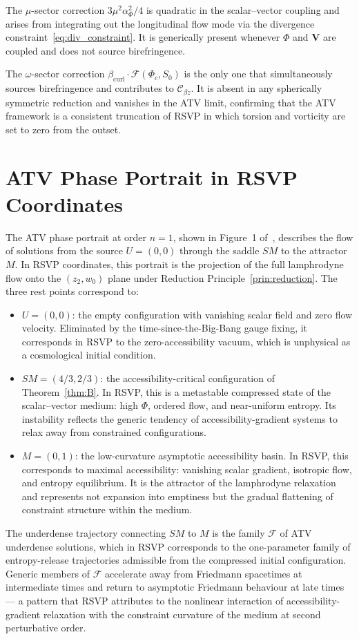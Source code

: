 \documentclass[12pt,a4paper]{article}
\theoremstyle{plain}
\theoremstyle{definition}
\theoremstyle{remark}
\newcommand{\Phic}{\Phi_c}
\newcommand{\SM}{\mathit{SM}}
\newcommand{\Mink}{\mathit{M}}
\newcommand{\Ffam}{\mathcal{F}}
\newcommand{\Cbz}{\mathcal{C}_{\beta z}}
\newcommand{\bcurl}{\beta_{\mathrm{curl}}}
\begin{document}
The $\mu$-sector correction $3\mu^2\alpha_\Phi^2/4$ is quadratic in the scalar--vector
coupling and arises from integrating out the longitudinal flow mode via the divergence
constraint~\eqref{eq:div_constraint}. It is generically present whenever $\Phi$ and
$\mathbf{V}$ are coupled and does not source birefringence.

The $\omega$-sector correction $\bcurl\cdot\mathcal{F}(\Phic,S_0)$ is the only one
that simultaneously sources birefringence and contributes to $\Cbz$. It is absent
in any spherically symmetric reduction and vanishes in the ATV limit, confirming
that the ATV framework is a consistent truncation of RSVP in which torsion and
vorticity are set to zero from the outset.

\section{ATV Phase Portrait in RSVP Coordinates}
\label{app:phase_portrait}

The ATV phase portrait at order $n=1$, shown in Figure~1 of~\cite{ATV2026},
describes the flow of solutions from the source $U=(0,0)$ through the saddle $\SM$
to the attractor $\Mink$. In RSVP coordinates, this portrait is the projection of
the full lamphrodyne flow onto the $(z_2,w_0)$ plane under Reduction
Principle~\ref{prin:reduction}. The three rest points correspond to:
\begin{itemize}[leftmargin=1.5em]
  \item $U = (0,0)$: the empty configuration with vanishing scalar field and zero
    flow velocity. Eliminated by the time-since-the-Big-Bang gauge fixing, it
    corresponds in RSVP to the zero-accessibility vacuum, which is unphysical as
    a cosmological initial condition.
  \item $\SM = (4/3, 2/3)$: the accessibility-critical configuration of
    Theorem~\ref{thm:B}. In RSVP, this is a metastable compressed state of the
    scalar--vector medium: high $\Phi$, ordered flow, and near-uniform entropy.
    Its instability reflects the generic tendency of accessibility-gradient systems
    to relax away from constrained configurations.
  \item $\Mink = (0,1)$: the low-curvature asymptotic accessibility basin.
    In RSVP, this corresponds to maximal accessibility: vanishing scalar gradient,
    isotropic flow, and entropy equilibrium. It is the attractor of the lamphrodyne
    relaxation and represents not expansion into emptiness but the gradual flattening
    of constraint structure within the medium.
\end{itemize}
The underdense trajectory connecting $\SM$ to $\Mink$ is the family $\Ffam$ of
ATV underdense solutions, which in RSVP corresponds to the one-parameter family of
entropy-release trajectories admissible from the compressed initial configuration.
Generic members of $\Ffam$ accelerate away from Friedmann spacetimes at intermediate
times and return to asymptotic Friedmann behaviour at late times --- a pattern
that RSVP attributes to the nonlinear interaction of accessibility-gradient relaxation
with the constraint curvature of the medium at second perturbative order.
\end{document}
